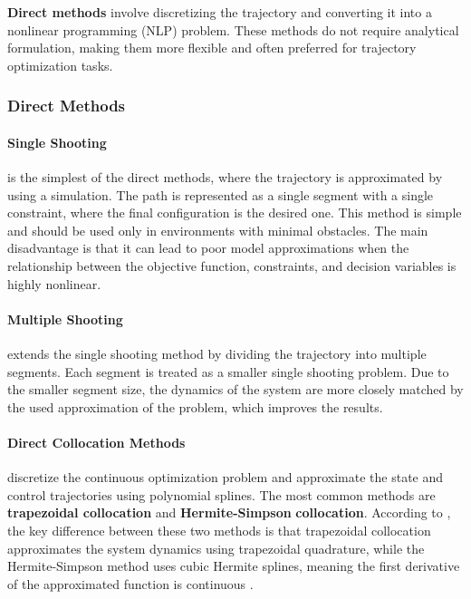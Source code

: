 \textbf{Direct methods} involve discretizing the trajectory and converting it into a nonlinear programming (NLP) problem. These methods do not require analytical formulation, making them more flexible and often preferred for trajectory optimization tasks.

\subsubsection{Direct Methods}
\paragraph{Single Shooting} is the simplest of the direct methods, where the trajectory is approximated by using a simulation. The path is represented as a single segment with a single constraint, where the final configuration is the desired one. This method is simple and should be used only in environments with minimal obstacles. The main disadvantage is that it can lead to poor model approximations when the relationship between the objective function, constraints, and decision variables is highly nonlinear.

\paragraph{Multiple Shooting} extends the single shooting method by dividing the trajectory into multiple segments. Each segment is treated as a smaller single shooting problem. Due to the smaller segment size, the dynamics of the system are more closely matched by the used approximation of the problem, which improves the results.

\paragraph{Direct Collocation Methods} discretize the continuous optimization problem and approximate the state and control trajectories using polynomial splines. The most common methods are \textbf{trapezoidal collocation} and \textbf{Hermite-Simpson} \textbf{collocation}. According to \cite{betts2010practical}, the key difference between these two methods is that trapezoidal collocation approximates the system dynamics using trapezoidal quadrature, while the Hermite-Simpson method uses cubic Hermite splines, meaning  the first derivative of the approximated function is continuous \cite{kelly2017introduction}.

